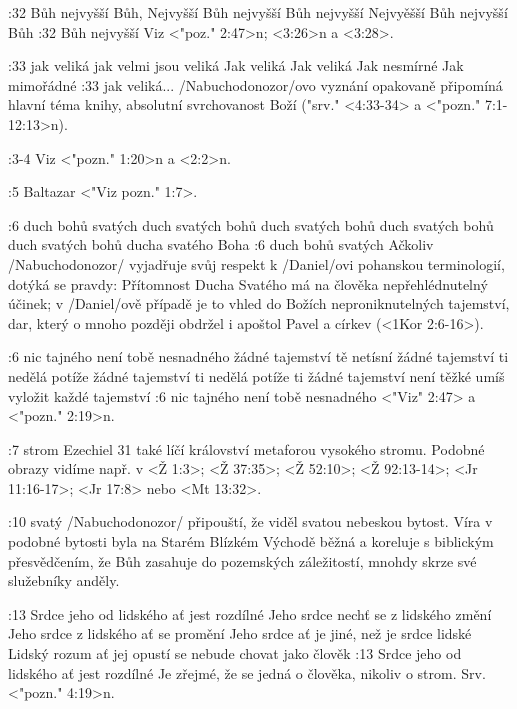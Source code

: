 :32  
    {Bůh nejvyšší}   %
    {Bůh, Nejvyšší}   %
    {Bůh nejvyšší}   %
    {Bůh nejvyšší}   %
    {Nejvyěšší Bůh}   %
    {nejvyšší Bůh}   %
:32 {Bůh nejvyšší} Viz <"poz." 2:47>n;  <3:26>n a <3:28>.

:33  
    {jak veliká}   %
    {jak velmi jsou veliká}   %
    {Jak veliká}   %
    {Jak veliká}   %
    {Jak nesmírné}   %
    {Jak mimořádné}   %
:33 {jak veliká}...  \x/Nabuchodonozor/ovo vyznání opakovaně připomíná hlavní téma knihy, absolutní svrchovanost Boží ("srv." <4:33-34> a <"pozn." 7:1-12:13>n).

:3-4 {} Viz <"pozn." 1:20>n a <2:2>n.

:5 {Baltazar} <"Viz pozn." 1:7>.

:6
    {duch bohů svatých}   %
    {duch svatých bohů}   %
    {duch svatých bohů}   %
    {duch svatých bohů}   %
    {duch svatých bohů}   %
    {ducha svatého Boha}   %
:6 {duch bohů svatých} Ačkoliv \x/Nabuchodonozor/ vyjadřuje svůj respekt k \x/Daniel/ovi pohanskou terminologií, dotýká se pravdy: Přítomnost Ducha Svatého má na člověka nepřehlédnutelný účinek; v \x/Daniel/ově případě je to vhled do Božích neproniknutelných tajemství, dar, který o mnoho později obdržel i apoštol Pavel a církev  (<1Kor 2:6-16>).

:6  
    {nic tajného není tobě nesnadného}   %
    {žádné tajemství tě netísní}   %
    {žádné tajemství ti nedělá potíže}   %
    {žádné tajemství ti nedělá potíže}   %
    {ti žádné tajemství není těžké}   %
    {umíš vyložit každé tajemství}   %
:6 {nic tajného není tobě nesnadného}  <"Viz" 2:47> a <"pozn." 2:19>n.

:7 {strom} Ezechiel 31 také líčí království metaforou vysokého stromu. Podobné obrazy vidíme např. v <Ž 1:3>; <Ž 37:35>; <Ž 52:10>; <Ž 92:13-14>; <Jr 11:16-17>; <Jr 17:8> nebo <Mt 13:32>. 

:10 {svatý}  \x/Nabuchodonozor/ připouští, že viděl svatou nebeskou bytost. Víra v podobné bytosti byla na Starém Blízkém Východě běžná a koreluje s biblickým přesvědčením, že Bůh zasahuje do pozemských záležitostí, mnohdy skrze své služebníky anděly.

:13  
    {Srdce jeho od lidského ať jest rozdílné}   %
    {Jeho srdce nechť se z lidského změní}   %
    {Jeho srdce z lidského ať se promění}   %
    {Jeho srdce ať je jiné, než je srdce lidské}   %
    {Lidský rozum ať jej opustí}   %
    {se nebude chovat jako člověk}   %
:13 {Srdce jeho od lidského ať jest rozdílné}
    Je zřejmé, že se jedná o člověka, nikoliv o strom. Srv. <"pozn." 4:19>n.

